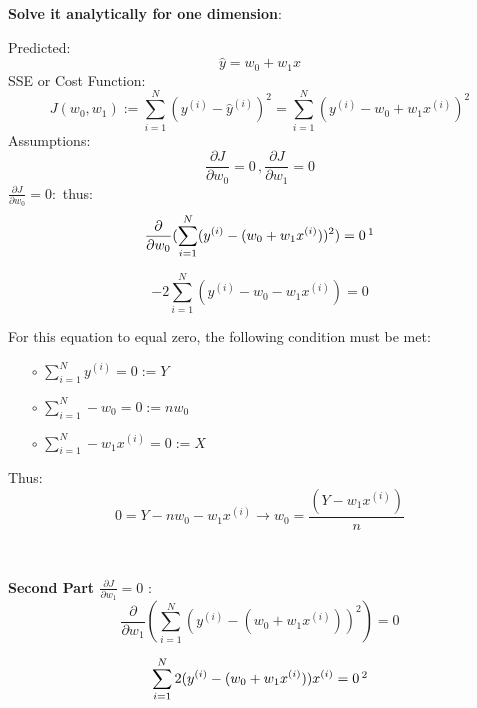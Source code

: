 \documentclass{article}
\newenvironment{cheatformula}[1][כותרת]{
    \begin{minipage}{\linewidth}
    \textbf{#1}:
}{
    \end{minipage}\\[0ex]
}
\begin{document}
\begin{multicols*}{2}
\begin{cheatformula}[Solve it analytically for one dimension]
Predicted:
\begin{equation}
\widehat{y} = w_{0} + w_{1}x
\end{equation}
SSE or Cost Function:
\begin{equation}
J(w_{0}, w_{1}) := \sum_{i=1}^{N}(y^{(i)} - \widehat{y}^{(i)})^{2} = \sum_{i=1}^{N}(y^{(i)} -  w_{0} + w_{1}x^{(i)})^{2}
\end{equation}
Assumptions:
\begin{equation}
\frac{\partial J}{\partial w_{0}} = 0 \,, \frac{\partial J}{\partial w_{1}} = 0
\end{equation}
$\frac{\partial J}{\partial w_{0}} = 0:$ thus:
\begin{equation}
\frac{\partial }{\partial w_{0}}  ( \sum_{i=1}^{N}(y^{(i)} -  (w_{0} + w_{1}x^{(i)}))^{2}) = 0  \, \footnotemark
\end{equation}

\begin{equation}
-2 \sum_{i=1}^{N}(y^{(i)} -  w_{0} - w_{1}x^{(i)}) = 0
\end{equation}

For this equation to equal zero, the following condition must be met:
\begin{itemize}
\item[$\circ$] $\sum_{i=1}^{N}y^{(i)} = 0 := Y$ 
\item[$\circ$] $\sum_{i=1}^{N}-w_{0}  = 0 := n w_{0} $ 
\item[$\circ$] $\sum_{i=1}^{N}-w_{1}x^{(i)}  = 0 := X $ 
\end{itemize}
Thus:
\begin{equation}
0 = Y - n w_{0} -w_{1}x^{(i)} \longrightarrow  w_{0} = \frac{(Y -w_{1}x^{(i)})}{n}
\end{equation}
\end{cheatformula}


\begin{cheatformula}[Second Part $\frac{\partial J}{\partial w_{1}} = 0$ ]\\

\begin{equation}
\frac{\partial }{\partial w_{1}}  ( \sum_{i=1}^{N}(y^{(i)} -  (w_{0} + w_{1}x^{(i)}))^{2}) = 0
\end{equation}

\begin{equation}
\sum_{i=1}^{N} 2(y^{(i)} -  (w_{0} + w_{1}x^{(i)})) x^{(i)} = 0  \, \footnotemark
\end{equation}


\end{cheatformula}
\end{multicols*}
\end{document}

